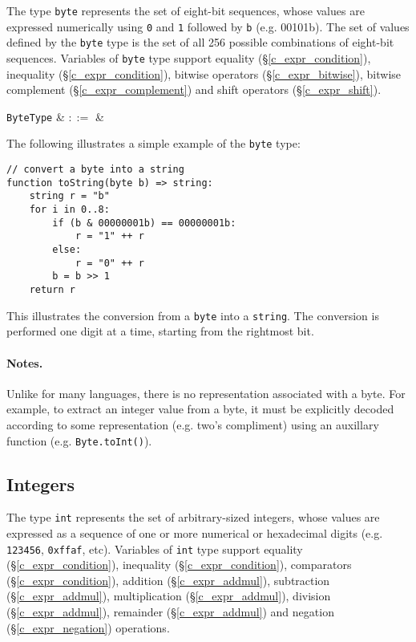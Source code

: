 The type \lstinline{byte} represents the set of eight-bit sequences, whose values are expressed numerically using \lstinline{0} and \lstinline{1} followed by \lstinline{b} (e.g. 00101b).  The set of values defined by the \lstinline{byte} type is the set of all 256 possible combinations of eight-bit sequences.   Variables of \lstinline{byte} type support equality (\S\ref{c_expr_condition}), inequality (\S\ref{c_expr_condition}), bitwise operators (\S\ref{c_expr_bitwise}), bitwise complement (\S\ref{c_expr_complement}) and shift operators (\S\ref{c_expr_shift}).

\begin{syntax}
 \verb+ByteType+ & $::=$ & \\
\end{syntax}

\noindent The following illustrates a simple example of the \lstinline{byte} type:

\begin{lstlisting}
// convert a byte into a string
function toString(byte b) => string:
    string r = "b"
    for i in 0..8:
        if (b & 00000001b) == 00000001b:
            r = "1" ++ r
        else:
            r = "0" ++ r
        b = b >> 1	
    return r
\end{lstlisting}
This illustrates the conversion from a \lstinline{byte} into a \lstinline{string}.  The conversion is performed one digit at a time, starting from the rightmost bit.

\paragraph{Notes.}  Unlike for many languages, there is no representation associated with a byte. For example, to extract an integer value from a byte, it must be explicitly decoded according to some representation (e.g. two's compliment) using an auxillary function (e.g. \lstinline{Byte.toInt()}).



\subsection{Integers}
\label{c_types_int}

The type \lstinline{int} represents the set of arbitrary-sized integers, whose values are expressed as a sequence of one or more numerical or hexadecimal digits (e.g. \lstinline{123456}, \lstinline{0xffaf}, etc).  Variables of \lstinline{int} type support equality (\S\ref{c_expr_condition}), inequality (\S\ref{c_expr_condition}), comparators (\S\ref{c_expr_condition}), addition (\S\ref{c_expr_addmul}), subtraction (\S\ref{c_expr_addmul}), multiplication (\S\ref{c_expr_addmul}), division (\S\ref{c_expr_addmul}), remainder (\S\ref{c_expr_addmul}) and negation (\S\ref{c_expr_negation}) operations.


